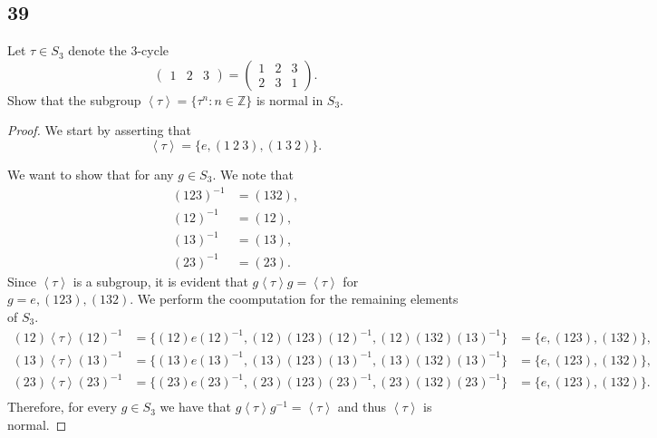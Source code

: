 \documentclass{article}
\newcommand{\Z}{\mathbb{Z}}
\newcommand{\gen}[1]{\left\langle #1 \right\rangle}
\newenvironment{hwproof}[1]
{
    #1
    \begin{proof}
}{
    \end{proof}
}
\begin{document}
\subsection*{39}
\begin{hwproof}
    {
        Let $\tau \in S_3$ denote the 3-cycle
        \begin{equation*}
            \begin{pmatrix}
                1 & 2 & 3
            \end{pmatrix}
            = \begin{pmatrix}
                1 & 2 & 3 \\
                2 & 3 & 1
            \end{pmatrix}
            .
        \end{equation*}
        Show that the subgroup $\gen{\tau} = \{\tau^n : n \in \Z\}$ is normal
        in $S_3$.
    }

    We start by asserting that
    \begin{equation*}
        \gen{\tau} = \{e, (1 \ 2 \ 3), (1 \ 3 \ 2)\}.
    \end{equation*}

    We want to show that for any $g \in S_3$. We note that
    \begin{align*}
        (123)^{-1} & = (132), \\
        (12)^{-1}  & = (12),  \\
        (13)^{-1}  & = (13),  \\
        (23)^{-1}  & = (23).
    \end{align*}
    Since $\gen{\tau}$ is a subgroup, it is evident that
    $g\gen{\tau}g = \gen{\tau}$ for $g = e, (123), (132)$. We perform the
    coomputation for the remaining elements of $S_3$.
    \begin{align*}
        (12)\gen{\tau}(12)^{-1} & = \{(12)e(12)^{-1}, (12)(123)(12)^{-1}, (12)(132)(13)^{-1}\}
                                & = \{e, (123), (132)\},                                       \\
        (13)\gen{\tau}(13)^{-1} & = \{(13)e(13)^{-1}, (13)(123)(13)^{-1}, (13)(132)(13)^{-1}\}
                                & = \{e, (123), (132)\},                                       \\
        (23)\gen{\tau}(23)^{-1} & = \{(23)e(23)^{-1}, (23)(123)(23)^{-1}, (23)(132)(23)^{-1}\}
                                & = \{e, (123), (132)\}.                                       \\
    \end{align*}
    Therefore, for every $g \in S_3$ we have that $g\gen{\tau}g^{-1} = \gen{\tau}$
    and thus $\gen{\tau}$ is normal.
\end{hwproof}
\end{document}
